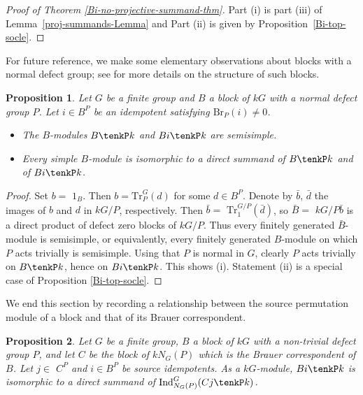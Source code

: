 \documentclass{amsart}
\theoremstyle{plain}\newtheorem{Theorem}{Theorem}[section]
\theoremstyle{plain}\newtheorem{Conjecture}[Theorem]{Conjecture}
\theoremstyle{plain}\newtheorem{Corollary}[Theorem]{Corollary}
\theoremstyle{plain}\newtheorem{Lemma}[Theorem]{Lemma}
\theoremstyle{plain}\newtheorem{Proposition}[Theorem]{Proposition}
\theoremstyle{definition}\newtheorem{Definition}[Theorem]{Definition}
\theoremstyle{definition}\newtheorem{Example}[Theorem]{Example}
\theoremstyle{definition}\newtheorem{Examples}[Theorem]{Examples}
\theoremstyle{definition}\newtheorem{Exercise}[Theorem]{Exercise}
\theoremstyle{definition}\newtheorem{Notation}[Theorem]{Notation}
\theoremstyle{definition}\newtheorem{Remark}[Theorem]{Remark}
\theoremstyle{definition}\newtheorem{Remarks}[Theorem]{Remarks}
\theoremstyle{plain}\newtheorem{Statement}[Theorem]{}
\def\Br{\mathrm{Br}}                 \def\ten{\otimes}
\def\Ind{\mathrm{Ind}}    \def\tenC{\otimes_C}
\def\Tr{\mathrm{Tr}}             \def\tenOT{\otimes_{\mathcal{O}T}}
\begin{document}
\begin{proof} [Proof of Theorem \ref{Bi-no-projective-summand-thm}]  
Part (i)  is  part (iii) of  Lemma~\ref{proj-summands-Lemma}  and Part (ii) 
is  given by  Proposition~\ref{Bi-top-socle}.
\end{proof}



For future reference, we make  some elementary observations
about blocks with a normal defect group; see \cite{Kuels85} for more details on
the structure of  such blocks.

\begin{Proposition} \label{normal-Prop}
Let $G$ be a finite group and $B$ a block of $kG$ with a normal defect group 
$P$.  Let $i\in B^P$ be an idempotent satisfying $\Br_P(i)\neq 0$.  
\begin{itemize}
\item[{\rm (i)}]
The $B$-modules $B\tenkP k$ and $Bi\tenkP k$ are semisimple.
\item[{\rm (ii)}]
 Every simple $B$-module is isomorphic to a direct summand of $B\tenkP k$
 and of $Bi\tenkP k$.
 \end{itemize}
 \end{Proposition}
 
\begin{proof} 
Set $b=$ $1_B$. Then $b=\Tr^G_P(d)$ for some $d\in B^P$. Denote by $\bar b$, 
$\bar d$ the images of $b$ and $d$ in $kG/P$, respectively. Then $\bar b=$ 
$\Tr^{G/P}_1(\bar d)$, so $\bar B=$ $kG/P\bar b$ is a direct product of defect zero 
blocks of $kG/P$.  Thus every finitely generated $\bar B$-module is semisimple, or
equivalently, every finitely generated $B$-module on which $P$ acts 
trivially is semisimple. Using that $P$ is normal in $G$, clearly $P$ acts trivially 
on $B\tenkP k$, hence on  $Bi\tenkP k$. This shows (i). 
Statement (ii) is a special case of Proposition \ref{Bi-top-socle}.
\end{proof}


We   end  this section by recording a  relationship between    the 
source permutation module of a block  and  that of its Brauer correspondent.

\begin{Proposition} \label{source-perm-module-Brauer-corr}
Let $G$ be a finite group, $B$ a block of $kG$ with a non-trivial defect group $P$,
and let $C$ be the block of $kN_G(P)$ which is the Brauer correspondent of $B$.
Let $j\in$ $C^P$ and $i\in B^P$ be source idempotents. 
As a $kG$-module,  $Bi\tenkP k$ is isomorphic to a direct summand of 
$\Ind^G_{N_G(P)}(Cj\tenkP k)$.
\end{Proposition}
\end{document}
